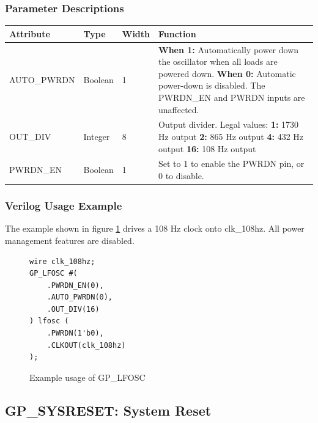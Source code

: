 \documentclass{article}
\begin{document}
\subsubsection{Parameter Descriptions}

\begin{tabularx}{5in}{|l|l|l|X|}
\hline
{\bfseries Attribute} & {\bfseries Type} & {\bfseries Width} & {\bfseries Function} \\
\hline
AUTO\_PWRDN & Boolean & 1 & 
	{\bfseries When 1: } \newline Automatically power down the oscillator when all loads are powered down. \newline
	{\bfseries When 0: } \newline Automatic power-down is disabled. The PWRDN\_EN and PWRDN inputs are unaffected.\\
\hline
OUT\_DIV & Integer & 8 &
	Output divider. Legal values: \newline
	{\bfseries 1:} 1730 Hz output \newline
	{\bfseries 2:} 865 Hz output \newline
	{\bfseries 4:} 432 Hz output \newline
	{\bfseries 16:} 108 Hz output
\\
\hline
PWRDN\_EN & Boolean & 1 & Set to 1 to enable the PWRDN pin, or 0 to disable. \\
\hline
\end{tabularx}

\subsubsection{Verilog Usage Example}

The example shown in figure \ref{gp-lfosc-example} drives a 108 Hz clock onto clk\_108hz. All power management features 
are disabled.

\begin{figure}[h]
\begin{lstlisting}
wire clk_108hz;
GP_LFOSC #(
	.PWRDN_EN(0),
	.AUTO_PWRDN(0),
	.OUT_DIV(16)
) lfosc (
	.PWRDN(1'b0),
	.CLKOUT(clk_108hz)
);
\end{lstlisting}
\caption{Example usage of GP\_LFOSC}
\label{gp-lfosc-example}
\end{figure}


\pagebreak
\clearpage
\subsection{GP\_SYSRESET: System Reset}
\end{document}
